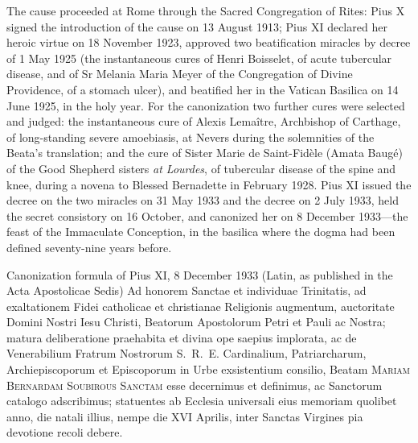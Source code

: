 The cause proceeded at Rome through the Sacred Congregation of
Rites: Pius X signed the introduction of the cause on 13 August
1913; Pius XI declared her heroic virtue on 18 November 1923,
approved two beatification miracles by decree of 1 May 1925 (the
instantaneous cures of Henri Boisselet, of acute tubercular
disease, and of Sr Melania Maria Meyer of the Congregation of
Divine Providence, of a stomach ulcer), and beatified her in the
Vatican Basilica on 14 June 1925, in the holy year. For the
canonization two further cures were selected and judged: the
instantaneous cure of Alexis Lema\^itre, Archbishop of Carthage,
of long-standing severe amoebiasis, at Nevers during the
solemnities of the Beata's translation; and the cure of Sister
Marie de Saint-Fid\`ele (Amata Baug\'e) of the Good Shepherd
sisters \emph{at Lourdes}, of tubercular disease of the spine and
knee, during a novena to Blessed Bernadette in February 1928.
Pius XI issued the decree on the two miracles on 31 May 1933 and
the  decree on 2 July 1933, held the secret
consistory on 16 October, and canonized her on 8 December
1933---the feast of the Immaculate Conception, in the basilica
where the dogma had been defined seventy-nine years
before.

\begin{operativetext}{Canonization formula of Pius XI, 8 December
1933 (Latin, as published in the Acta Apostolicae Sedis)}
Ad honorem Sanctae et individuae Trinitatis, ad exaltationem
Fidei catholicae et christianae Religionis augmentum, auctoritate
Domini Nostri Iesu Christi, Beatorum Apostolorum Petri et Pauli
ac Nostra; matura deliberatione praehabita et divina ope saepius
implorata, ac de Venerabilium Fratrum Nostrorum S.~R.~E.
Cardinalium, Patriarcharum, Archiepiscoporum et Episcoporum in
Urbe exsistentium consilio, Beatam \textsc{Mariam Bernardam
Soubirous Sanctam} esse decernimus et definimus, ac Sanctorum
catalogo adscribimus; statuentes ab Ecclesia universali eius
memoriam quolibet anno, die natali illius, nempe die XVI Aprilis,
inter Sanctas Virgines pia devotione recoli
debere.
\end{operativetext}

